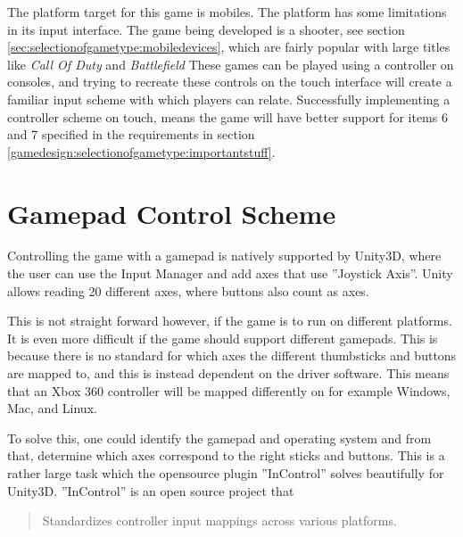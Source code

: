 The platform target for this game is mobiles.
The platform has some limitations in its input interface.
The game being developed is a shooter, see section \ref{sec:selectionofgametype:mobiledevices}, which are fairly popular with large titles like \emph{Call Of Duty} and \emph{Battlefield}
These games can be played using a controller on consoles, and trying to recreate these controls on the touch interface will create a familiar input scheme with which players can relate.
Successfully implementing a controller scheme on touch, means the game will have better support for items 6 and 7 specified in the requirements in section \ref{gamedesign:selectionofgametype:importantstuff}.

\section{Gamepad Control Scheme}
Controlling the game with a gamepad is natively supported by Unity3D, where the user can use the Input Manager \cite{unity_manual_inputmanager} and add axes that use ''Joystick Axis''. Unity allows reading 20 different axes, where buttons also count as axes.

This is not straight forward however, if the game is to run on different platforms. It is even more difficult if the game should support different gamepads. This is because there is no standard for which axes the different thumbsticks and buttons are mapped to, and this is instead dependent on the driver software. This means that an Xbox 360 controller will be mapped differently on for example Windows, Mac, and Linux.
\cite{unity_wiki_xbox360controller}

To solve this, one could identify the gamepad and operating system and from that, determine which axes correspond to the right sticks and buttons. This is a rather large task which the opensource plugin ''InControl'' solves beautifully for Unity3D\cite{incontrol_github}. ''InControl'' is an open source project that \begin{quote}Standardizes controller input mappings across various platforms.\cite{incontrol_website}\end{quote}

